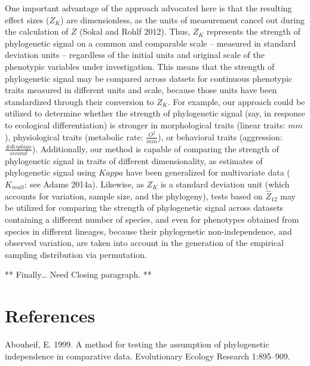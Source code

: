 \documentclass[
]{article}
\begin{document}
One important advantage of the approach advocated here is that the
resulting effect sizes (\(Z_K\)) are dimensionless, as the units of
measurement cancel out during the calculation of \(Z\) (Sokal and Rohlf
2012). Thus, \(Z_K\) represents the strength of phylogenetic signal on a
common and comparable scale -- measured in standard deviation units --
regardless of the initial units and original scale of the phenotypic
variables under investigation. This means that the strength of
phylogenetic signal may be compared across datsets for continuous
phenotypic traits measured in different units and scale, because those
units have been standardized through their conversion to \(Z_K\). For
example, our approach could be utilized to determine whether the
strength of phylogenetic signal (say, in response to ecological
differentiation) is stronger in morphological traits (linear traits:
\(mm\)), physiological traits (metabolic rate: \(\frac{O^2}{min}\)), or
behavioral traits (aggression: \(\frac{\#{displays}}{second}\)).
Additionally, our method is capable of comparing the strength of
phylogenetic signal in traits of different dimensionality, as estimates
of phylogenetic signal using \(Kappa\) have been generalized for
multivariate data (\(K_{mult}\): see Adams 2014a). Likewise, as \(Z_K\)
is a standard deviation unit (which accounts for variation, sample size,
and the phylogeny), tests based on \(\hat{Z}_{12}\) may be utilized for
comparing the strength of phylogenetic signal across datasets containing
a different number of species, and even for phenotypes obtained from
species in different lineages, because their phylogenetic
non-independence, and observed variation, are taken into account in the
generation of the empirical sampling distribution via permutation.
\hfill\break

** Finally\ldots{} Need Closing paragraph. **

\newpage

\hypertarget{references}{%
\section{References}\label{references}}

\setlength{\parindent}{-0.25in} \setlength{\leftskip}{0.25in}
\setlength{\parskip}{8pt} \noindent

\hypertarget{refs}{}
\leavevmode\hypertarget{ref-Abouheif1999}{}%
Abouheif, E. 1999. A method for testing the assumption of phylogenetic
independence in comparative data. Evolutionary Ecology Research
1:895--909.
\end{document}
